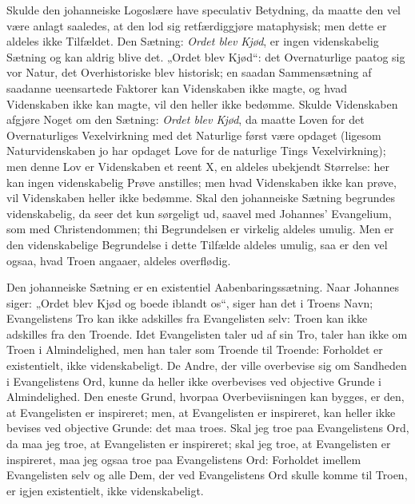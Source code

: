 \documentclass[12pt,a4paper]{book}
\newcommand{\opage}[1]{\marginnote{\footnotesize\textit{[#1]}}}
\begin{document}
Skulde den johanneiske Logoslære have speculativ Betydning, da maatte den
vel være anlagt saaledes, at den lod sig retfærdiggjøre mataphysisk; men
dette er aldeles ikke Tilfældet. Den Sætning: \emph{Ordet blev Kjød}, er
ingen videnskabelig Sætning og kan aldrig blive det. „Ordet blev Kjød“: det
Overnaturlige paatog sig vor Natur, det Overhistoriske blev historisk; en
saadan Sammensætning af saadanne ueensartede Faktorer kan
\opage{104} Videnskaben ikke magte, og hvad Videnskaben ikke kan magte, vil den heller
ikke bedømme. Skulde Videnskaben afgjøre Noget om den Sætning:
\emph{Ordet blev Kjød}, da maatte Loven for det Overnaturliges
Vexelvirkning med det Naturlige først være opdaget (ligesom
Naturvidenskaben jo har opdaget Love for de naturlige Tings Vexelvirkning);
men denne Lov er Videnskaben et reent X, en aldeles ubekjendt Størrelse:
her kan ingen videnskabelig Prøve anstilles; men hvad Videnskaben ikke kan
prøve, vil Videnskaben heller ikke bedømme. Skal den johanneiske Sætning
begrundes videnskabelig, da seer det kun sørgeligt ud, saavel med Johannes'
Evangelium, som med Christendommen; thi Begrundelsen er virkelig aldeles
umulig. Men er den videnskabelige Begrundelse i dette Tilfælde aldeles
umulig, saa er den vel ogsaa, hvad Troen angaaer, aldeles overflødig.

Den johanneiske Sætning er en existentiel Aabenbaringssætning. Naar
Johannes siger: „Ordet blev Kjød og boede iblandt os“, siger han det i
Troens Navn; Evangelistens Tro kan ikke adskilles fra Evangelisten selv:
Troen kan ikke adskilles fra den Troende. Idet Evangelisten taler ud af sin
Tro, taler han ikke om Troen i Almindelighed, men han taler som Troende til
Troende: Forholdet er existentielt, ikke videnskabeligt. De Andre, der
ville overbevise sig om Sandheden i Evangelistens Ord, kunne da heller ikke
overbevises ved objective Grunde i Almindelighed. Den eneste Grund, hvorpaa
Overbeviisningen kan bygges, er den, at Evangelisten er inspireret; men, at
Evangelisten er inspireret, kan heller ikke bevises ved objective Grunde:
det maa troes. Skal jeg troe paa Evangelistens Ord, da maa jeg troe, at
Evangelisten er inspireret; skal jeg troe, at Evangelisten er inspireret,
maa jeg ogsaa troe paa Evangelistens Ord: Forholdet imellem Evangelisten
selv og alle Dem, der ved Evangelistens Ord skulle komme til Troen, er
igjen existentielt, ikke videnskabeligt.
\end{document}
